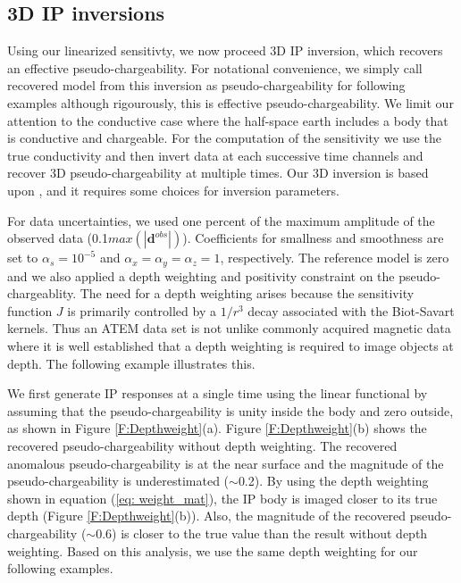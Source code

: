 \documentclass[a4paper, 11pt]{article}
\begin{document}
\subsection{3D IP inversions}
Using our linearized sensitivty, we now proceed 3D IP inversion, which recovers an effective pseudo-chargeability. For notational convenience, we simply call recovered model from this inversion as pseudo-chargeability for following examples although rigourously, this is effective pseudo-chargeability. 
We limit our attention to the conductive case where the half-space earth includes a body that is conductive and chargeable.
For the computation of the sensitivity we use the true conductivity and then invert data at each  successive time channels and recover 3D pseudo-chargeability at multiple times. 
Our 3D inversion is based upon \cite{doug1994,Li2000}, and it requires some choices for inversion parameters. 

For data uncertainties, we used one percent of the maximum amplitude of the observed data (0.1$max(|\mathbf{d}^{obs}|)$). Coefficients for smallness and smoothness are set to $\alpha_s=10^{-5}$ and $\alpha_x=\alpha_y=\alpha_z=1$, respectively. The reference model is zero and we also applied a depth weighting and positivity constraint on the pseudo-chargeablity. 
The need for a depth weighting arises because the sensitivity function $J$ is primarily controlled by a $1/r^3$ decay associated with the Biot-Savart kernels.  Thus an ATEM data set is not unlike commonly acquired  magnetic data where it is well established that a depth weighting is required to image objects at depth. The following example illustrates this. 

We first generate IP responses at a single time using the linear functional by assuming that the pseudo-chargeability is unity inside the body and zero outside, as shown in  Figure \ref{F:Depthweight}(a). 
Figure \ref{F:Depthweight}(b) shows the recovered pseudo-chargeability without depth weighting. 
The recovered anomalous pseudo-chargeability is  at the near surface and the magnitude of the pseudo-chargeability is underestimated ($\sim$0.2). 
By using the depth weighting shown in equation (\ref{eq: weight_mat}),  the IP body is imaged closer to its true depth (Figure \ref{F:Depthweight}(b)). 
Also, the magnitude of the recovered pseudo-chargeability ($\sim$0.6) is closer to the true value than the result without depth weighting. 
Based on this analysis, we use the same depth weighting for our  following examples. 
\end{document}
